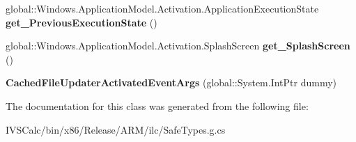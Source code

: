 \begin{DoxyCompactItemize}
global\+::\+Windows.\+Application\+Model.\+Activation.\+Application\+Execution\+State {\bfseries get\+\_\+\+Previous\+Execution\+State} ()
\item 
\mbox{\label{class_windows_1_1_application_model_1_1_activation_1_1_cached_file_updater_activated_event_args_a319cfb525fe9fa17cf926258148c647f}} 
global\+::\+Windows.\+Application\+Model.\+Activation.\+Splash\+Screen {\bfseries get\+\_\+\+Splash\+Screen} ()
\item 
\mbox{\label{class_windows_1_1_application_model_1_1_activation_1_1_cached_file_updater_activated_event_args_a844d82c24a31bc04836b059ef6b16a43}} 
{\bfseries Cached\+File\+Updater\+Activated\+Event\+Args} (global\+::\+System.\+Int\+Ptr dummy)
\end{DoxyCompactItemize}


The documentation for this class was generated from the following file\+:\begin{DoxyCompactItemize}
\item 
I\+V\+S\+Calc/bin/x86/\+Release/\+A\+R\+M/ilc/Safe\+Types.\+g.\+cs\end{DoxyCompactItemize}
